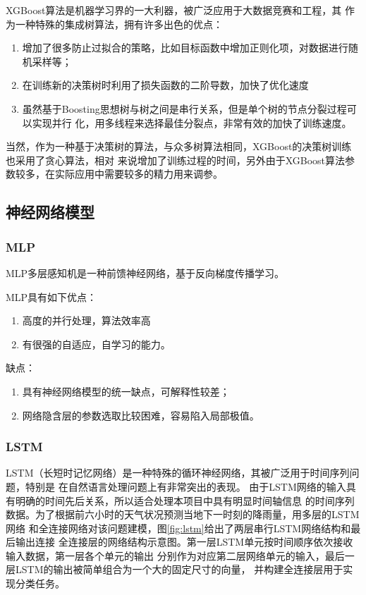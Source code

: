 \documentclass[UTF8]{ctexart}
\begin{document}
XGBoost算法是机器学习界的一大利器，被广泛应用于大数据竞赛和工程，其
作为一种特殊的集成树算法，拥有许多出色的优点：
\begin{enumerate}[(1)]
    \item 增加了很多防止过拟合的策略，比如目标函数中增加正则化项，对数据进行随机采样等；
    \item 在训练新的决策树时利用了损失函数的二阶导数，加快了优化速度
    \item 虽然基于Boosting思想树与树之间是串行关系，但是单个树的节点分裂过程可以实现并行
    化，用多线程来选择最佳分裂点，非常有效的加快了训练速度。
\end{enumerate}

当然，作为一种基于决策树的算法，与众多树算法相同，XGBoost的决策树训练也采用了贪心算法，相对
来说增加了训练过程的时间，另外由于XGBoost算法参数较多，在实际应用中需要较多的精力用来调参。

\subsection{神经网络模型}

\subsubsection{MLP}
MLP多层感知机是一种前馈神经网络，基于反向梯度传播学习。

MLP具有如下优点：
\begin{enumerate}[(1)]
	\item 高度的并行处理，算法效率高
	\item 有很强的自适应，自学习的能力。
\end{enumerate}

缺点：
\begin{enumerate}[(1)]
	\item 具有神经网络模型的统一缺点，可解释性较差；
	\item 网络隐含层的参数选取比较困难，容易陷入局部极值。
	
\end{enumerate}

\subsubsection{LSTM}

LSTM（长短时记忆网络）是一种特殊的循环神经网络，其被广泛用于时间序列问题，特别是
在自然语言处理问题上有非常突出的表现。
由于LSTM网络的输入具有明确的时间先后关系，所以适合处理本项目中具有明显时间轴信息
的时间序列数据。为了根据前六小时的天气状况预测当地下一时刻的降雨量，用多层的LSTM网络
和全连接网络对该问题建模，图\ref{fig:lstm}给出了两层串行LSTM网络结构和最后输出连接
全连接层的网络结构示意图。第一层LSTM单元按时间顺序依次接收输入数据，第一层各个单元的输出
分别作为对应第二层网络单元的输入，最后一层LSTM的输出被简单组合为一个大的固定尺寸的向量，
并构建全连接层用于实现分类任务。
\end{document}
